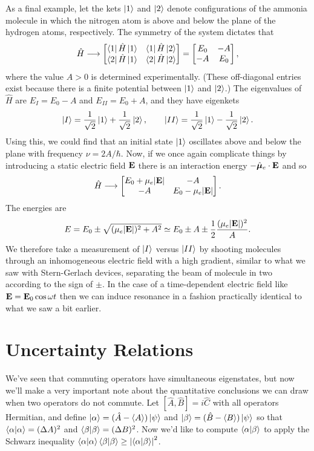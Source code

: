 \documentclass[../p116main.tex]{subfiles}
\begin{document}
As a final example, let the kets $\left| 1 \right>$ and $\left| 2 \right>$ denote configurations of the ammonia molecule in which the nitrogen atom is above and below the plane of the hydrogen atoms, respectively.
The symmetry of the system dictates that
\[ \hat H \longrightarrow \begin{bmatrix} \left< 1 \right| \hat H \left| 1 \right> & \left< 1 \right| \hat H \left| 2 \right> \\ \left< 2 \right| \hat H \left| 1 \right> & \left< 2 \right| \hat H \left| 2 \right> \end{bmatrix} = \begin{bmatrix} E_0 & -A \\ -A & E_0 \end{bmatrix}, \]
where the value $A > 0$ is determined experimentally.
(These off-diagonal entries exist because there is a finite potential between $\left| 1 \right>$ and $\left| 2 \right>$.)
The eigenvalues of $\hat H$ are $E_I = E_0 - A$ and $E_{II} = E_0 + A$, and they have eigenkets
\[ \left| I \right> = \frac{1}{\sqrt{2}} \left| 1 \right> + \frac{1}{\sqrt{2}} \left| 2 \right>, \qquad \left| II \right> = \frac{1}{\sqrt{2}} \left| 1 \right> - \frac{1}{\sqrt{2}} \left| 2 \right>. \]
Using this, we could find that an initial state $\left| 1 \right>$ oscillates above and below the plane with frequency $\nu = 2A / \hbar$.
Now, if we once again complicate things by introducing a static electric field $\mathbf{E}$ there is an interaction energy $-\hat{\bm \mu}_e \cdot \mathbf{E}$ and so
\[ \hat H \longrightarrow \begin{bmatrix} E_0 + \mu_e |\mathbf{E}| & -A \\ -A &  E_0- \mu_e |\mathbf{E}| \end{bmatrix}. \]
The energies are
\[ E = E_0 \pm \sqrt{(\mu_e |\mathbf{E}|)^2 + A^2} \simeq E_0 \pm A \pm \frac{1}{2} \frac{(\mu_e |\mathbf{E}|)^2}{A}. \]
We therefore take a measurement of $\left| I \right>$ versus $\left| II \right>$ by shooting molecules through an inhomogeneous electric field with a high gradient, similar to what we saw with Stern-Gerlach devices, separating the beam of molecule in two according to the sign of $\pm$.
In the case of a time-dependent electric field like $\mathbf{E} = \mathbf{E}_0 \cos \omega t$ then we can induce resonance in a fashion practically identical to what we saw a bit earlier.

\section{Uncertainty Relations}
We've seen that commuting operators have simultaneous eigenstates, but now we'll make a very important note about the quantitative conclusions we can draw when two operators do not commute.
Let $[\hat A, \hat B] = i \hat C$ with all operators Hermitian, and define $\left| \alpha \right> = (\hat A - \left< A \right>) \left| \psi \right>$ and $\left| \beta \right> = (\hat B - \left< B \right>) \left| \psi \right>$ so that $\left< \alpha \middle| \alpha \right> = (\Delta A)^2$ and $\left< \beta \middle| \beta \right> = (\Delta B)^2$.
Now we'd like to compute $\left< \alpha \middle| \beta \right>$ to apply the Schwarz inequality $\left< \alpha \middle| \alpha \right> \left< \beta \middle| \beta \right> \geq \left| \left< \alpha \middle| \beta \right> \right|^2$.
\end{document}
